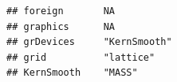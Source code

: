 \documentclass[]{article}
\begin{document}
\begin{verbatim}
## foreign       NA                                                                                                                                                                                                                                                                                                                                                                                                                                                                                                                                                                                        
## graphics      NA                                                                                                                                                                                                                                                                                                                                                                                                                                                                                                                                                                                        
## grDevices     "KernSmooth"                                                                                                                                                                                                                                                                                                                                                                                                                                                                                                                                                                              
## grid          "lattice"                                                                                                                                                                                                                                                                                                                                                                                                                                                                                                                                                                                 
## KernSmooth    "MASS"                                                                                                                                                                                                                                                                                                                                                                                                                                                                                                                                                                                    

\end{verbatim}
\end{document}
